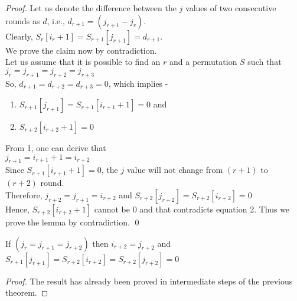\documentclass{llncs}
\begin{document}
\begin{proof}
Let us denote the difference between the $j$ values of two consecutive rounds as $d$, i.e., $d_{r+1} = (j_{r+1} - j_{r})$. \\

\noindent Clearly, $S_{r}[i_{r}+1] = S_{r+1}[j_{r+1}] = d_{r+1}$. \\

\noindent We prove the claim now by contradiction. \\

\noindent Let us assume that it is possible to find an $r$ and a permutation $S$ such that $j_{r} = j_{r+1} = j_{r+2} = j_{r+3}$ \\

\noindent So, $d_{r+1}=d_{r+2}=d_{r+3}=0$, which implies -\\ 


\begin{enumerate}
\item $S_{r+1}[j_{r+1}] = S_{r+1}[i_{r+1}+1] = 0$ and \\
\item $S_{r+2}[i_{r+2}+1] = 0$ \\
\end{enumerate}


\noindent From 1, one can derive that \\


$j_{r+1}= i_{r+1}+1 = i_{r+2}$ \\

Since $S_{r+1}[i_{r+1}+1] = 0$, the $j$ value will not change from $(r+1)$ to $(r+2)$ round. \\

Therefore, $j_{r+2} = j_{r+1} = i_{r+2}$ and 
$S_{r+2}[j_{r+2}] = S_{r+2}[i_{r+2}] = 0$\\


\noindent Hence, $S_{r+2}[i_{r+2}+1]$ cannot be $0$ and that contradicts equation 2. Thus we prove the lemma by contradiction. \qed

\end{proof}

\begin{corollary}

If $(j_{r} = j_{r+1} = j_{r+2})$ then $i_{r+2} = j_{r+2}$ and $S_{r+1}[j_{r+1}] = S_{r+2}[i_{r+2}] = S_{r+2}[j_{r+2}] = 0$

\end{corollary} 

\begin{proof}
The result has already been proved in intermediate steps of the previous theorem.
\end{proof}
\end{document}
